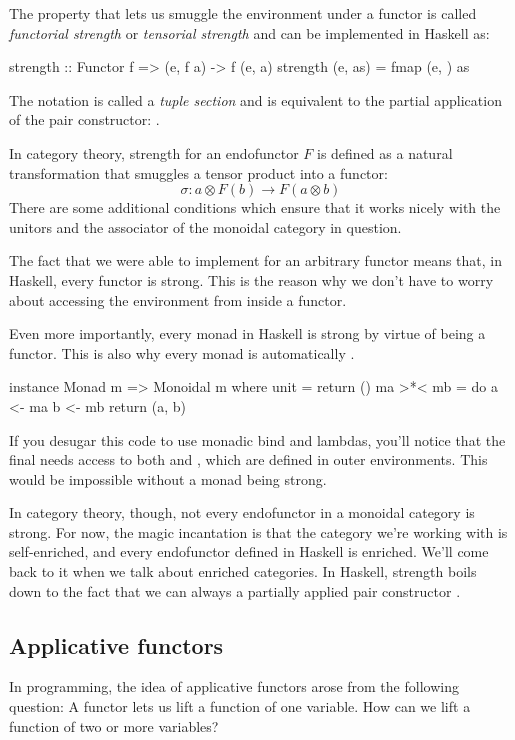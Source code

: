 \documentclass[DaoFP]{subfiles}
\begin{document}
The property that lets us smuggle the environment under a functor is called \emph{functorial strength} or \emph{tensorial strength} and can be implemented in Haskell as:
\begin{haskell}
strength :: Functor f => (e, f a) -> f (e, a)
strength (e, as) = fmap (e, ) as
\end{haskell}
The notation  is called a \emph{tuple section} and is equivalent to the partial application of the pair constructor: .

In category theory, strength for an endofunctor $F$ is defined as a natural transformation that smuggles a tensor product into a functor:
\[ \sigma \colon a \otimes F(b) \to F (a \otimes b) \]
There are some additional conditions which ensure that it works nicely with the unitors and the associator of the monoidal category in question.

The fact that we were able to implement  for an arbitrary functor means that, in Haskell, every functor is strong. This is the reason why we don't have to worry about accessing the environment from inside a functor. 

Even more importantly, every monad in Haskell is strong by virtue of being a functor. This is also why every monad is automatically . 
\begin{haskell}
instance Monad m => Monoidal m where
  unit = return ()
  ma >*< mb = do
    a <- ma
    b <- mb
    return (a, b)
\end{haskell}
If you desugar this code to use monadic bind and lambdas, you'll notice that the final  needs access to both  and , which are defined in outer environments. This would be impossible without a monad being strong.

In category theory, though, not every endofunctor in a monoidal category is strong. For now, the magic incantation is that the category we're working with is self-enriched, and every endofunctor defined in Haskell is enriched. We'll come back to it when we talk about enriched categories. In Haskell, strength boils down to the fact that we can always  a partially applied pair constructor .

\subsection{Applicative functors}

In programming, the idea of applicative functors arose from the following question: A functor lets us lift a function of one variable. How can we lift a function of two or more variables? 
\end{document}
